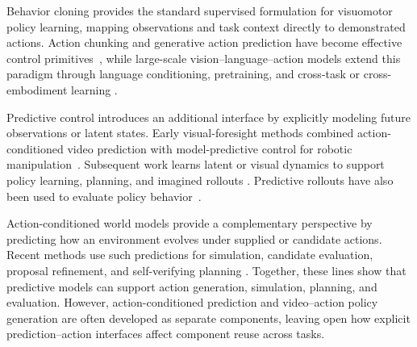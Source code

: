 Behavior cloning provides the standard supervised formulation for visuomotor
policy learning, mapping observations and task context directly to demonstrated
actions. Action chunking and generative action prediction have become effective
control primitives~\cite{zhao2023learning, chi2025diffusion}, while large-scale
vision--language--action models extend this paradigm through language
conditioning, pretraining, and cross-task or cross-embodiment learning
\cite{brohan2022rt, brohan2023rt, kim2024openvla, black2024pi_0,
intelligence2025pi_, o2024open, team2024octo}.

Predictive control introduces an additional interface by explicitly modeling
future observations or latent states. Early visual-foresight methods combined
action-conditioned video prediction with model-predictive control for robotic
manipulation~\cite{finn2017deep,ebert2018visual}. Subsequent work learns latent
or visual dynamics to support policy learning, planning, and imagined rollouts
\cite{hafner2019dream, hafner2023mastering, wu2023daydreamer,
wu2024unleashing, cheang2024gr, zhou2024robodreamer}. Predictive rollouts have also been used to evaluate policy behavior~\cite{li2025worldeval, guo2026ctrl}.

Action-conditioned world models provide a complementary perspective by
predicting how an environment evolves under supplied or candidate actions.
Recent methods use such predictions for simulation, candidate evaluation,
proposal refinement, and self-verifying planning
\cite{huang2026learning, zhou2026tau_0, qi2026inference,
zhang2026worldcoherent}. Together, these lines show that predictive models can
support action generation, simulation, planning, and evaluation. However,
action-conditioned prediction and video--action policy generation are often
developed as separate components, leaving open how explicit
prediction--action interfaces affect component reuse across tasks.




